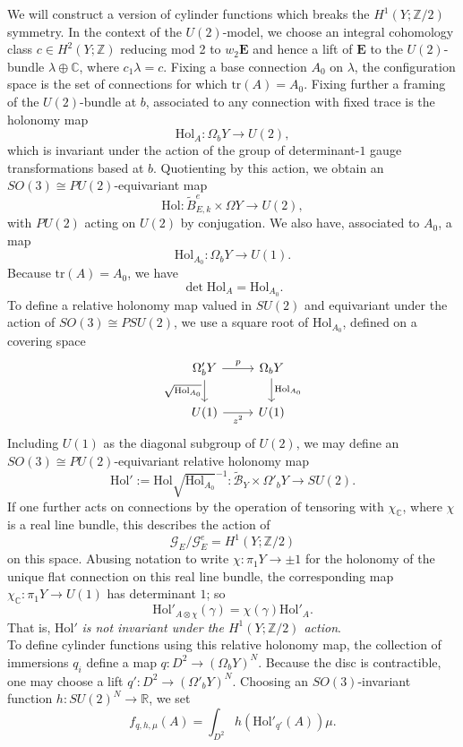 \documentclass{memo-l}
\theoremstyle{definition}
\theoremstyle{remark}
\numberwithin{section}{chapter}
\numberwithin{equation}{chapter}
\begin{document}
We will construct a version of cylinder functions which breaks the $H^1(Y; \mathbb Z/2)$ symmetry. In the context of the $U(2)$-model, we choose an integral cohomology class $c \in H^2(Y;\mathbb Z)$ reducing mod 2 to $w_2 \mathbf{E}$ and hence a lift of $\mathbf{E}$ to the $U(2)$-bundle $\lambda \oplus \mathbb C$, where $c_1 \lambda = c$. Fixing a base connection $A_0$ on $\lambda$, the configuration space is the set of connections for which $\text{tr}(A) = A_0$. Fixing further a framing of the $U(2)$-bundle at $b$, associated to any connection with fixed trace is the holonomy map 
$$\text{Hol}_A: \Omega_b Y \to U(2),$$
which is invariant under the action of the group of determinant-$1$ gauge transformations based at $b$. Quotienting by this action, we obtain an $SO(3) \cong PU(2)$-equivariant map \[\text{Hol}: \widetilde B^e_{E,k} \times \Omega Y \to U(2),\] with $PU(2)$ acting on $U(2)$ by conjugation. We also have, associated to $A_0$, a map 
$$\text{Hol}_{A_0}: \Omega_b Y \to U(1).$$ 
Because $\text{tr}(A) = A_0$, we have 
$$\det \text{Hol}_A = \text{Hol}_{A_0}.$$ 
To define a relative holonomy map valued in $SU(2)$ and equivariant under the action of $SO(3) \cong PSU(2)$, we use a square root of $\text{Hol}_{A_0}$, defined on a covering space 
\[\begin{tikzcd}
	{\Omega'_b Y} & {\Omega_b Y} \\
	{U(1)} & {U(1)}
	\arrow["p", from=1-1, to=1-2]
	\arrow["{\sqrt{\text{Hol}_{A_0}}}"', from=1-1, to=2-1]
	\arrow["{\text{Hol}_{A_0}}", from=1-2, to=2-2]
	\arrow["{z^2}"', from=2-1, to=2-2]
\end{tikzcd}\]
Including $U(1)$ as the diagonal subgroup of $U(2)$, we may define an $SO(3) \cong PU(2)$-equivariant relative holonomy map 
$$\text{Hol}' := \text{Hol} \sqrt{\text{Hol}_{A_0}}^{-1}: \widetilde{\mathcal B}_Y \times \Omega'_b Y \to SU(2).$$ 
If one further acts on connections by the operation of tensoring with $\chi_{\mathbb C}$, where $\chi$ is a real line bundle, this describes the action of 
$$\mathcal G_E/\mathcal G^e_E = H^1(Y;\mathbb Z/2)$$ 
on this space. Abusing notation to write $\chi: \pi_1 Y \to \pm 1$ for the holonomy of the unique flat connection on this real line bundle, the corresponding map $\chi_{\mathbb C}: \pi_1 Y \to U(1)$ has determinant $1$; so 
$$\text{Hol}'_{A \otimes \chi}(\gamma) = \chi(\gamma) \text{Hol}'_A.$$
That is, $\text{Hol}'$ \emph{is not invariant under the $H^1(Y;\mathbb Z/2)$ action}.\\

To define cylinder functions using this relative holonomy map, the collection of immersions $q_i$ define a map $q: D^2 \to (\Omega_b Y)^N$. Because the disc is contractible, one may choose a lift $q': D^2 \to (\Omega'_b Y)^N$. Choosing an $SO(3)$-invariant function $h: SU(2)^N \to \mathbb R$, we set \[f_{q,h,\mu}(A) = \int_{D^2} h(\text{Hol}'_{q'}(A)) \mu.\] 
\end{document}
